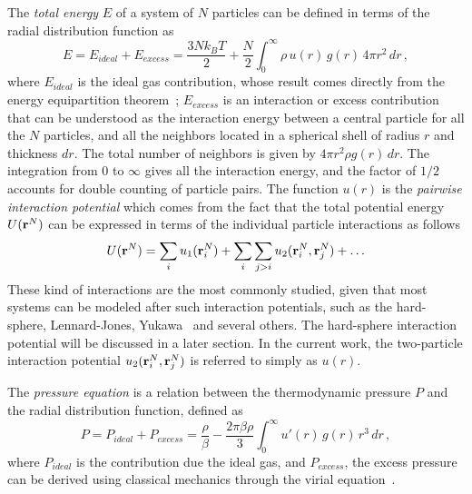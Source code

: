 The \emph{total energy} $E$ of a system of $N$ particles can be defined in terms of the
radial distribution function as
\begin{equation}
    E = E_{ideal} + E_{excess} = \frac{3 N k_{B} T}{2} +
    \frac{N}{2} \int_{0}^{\infty} \rho \, u(r) \, g(r) \, 4 \pi r^2 \, dr
    \, ,
    \label{eq:total-energy-rdf}
\end{equation}
where $E_{ideal}$ is the ideal gas contribution, whose result comes directly from
the energy equipartition theorem~\cite{mcquarrieStatisticalMechanics2000};
$E_{excess}$ is an interaction or excess contribution that can be understood
as the interaction energy between a central particle for all the $N$ particles,
and all the neighbors located in a spherical shell of radius $r$ and thickness
$dr$. The total number of neighbors is given by $4 \pi r^2 \rho g(r) \, dr$.
The integration from $0$ to $\infty$ gives all the interaction energy, and
the factor of $1/2$ accounts for double counting of particle pairs.
The function $u(r)$ is the \emph{pairwise interaction potential} which comes
from the fact that the total potential energy $U(\mathbf{r}^{N})$ can be expressed
in terms of the individual particle interactions as follows
\begin{equation}
    U(\vecr^{N}) = \sum_{i} u_{1} (\vecr_{i}^{N}) +
    \sum_{i} \sum_{j>i} u_{2} (\vecr_{i}^{N}, \vecr_{j}^{N}) +
    \dots
    \label{eq:pairwise-energy}
\end{equation}
These kind of interactions are the most commonly studied, given that most
systems can be modeled after such interaction potentials, such as the
hard-sphere, Lennard-Jones, Yukawa~\cite{huangStatisticalMechanics1987}
and several others. The hard-sphere interaction potential will be discussed
in a later section.
In the current work, the two-particle interaction potential
$u_{2} (\mathbf{r}_{i}^{N}, \mathbf{r}_{j}^{N})$ is referred to simply as $u(r)$.

The \emph{pressure equation} is a relation between the thermodynamic pressure
$P$ and the radial distribution function, defined as
\begin{equation}
    P=P_{ideal}+P_{excess}= \frac{\rho}{\beta} - \frac{2 \pi \beta \rho}{3}
    \int_{0}^{\infty} u'(r) \, g(r) \, r^3 \, dr \, ,
    \label{eq:pressure-equation}
\end{equation}
where $P_{ideal}$ is the contribution due the ideal gas, and $P_{excess}$,
the excess pressure can be derived using classical mechanics through the
virial equation~\cite{hansenTheorySimpleLiquids2013}.

